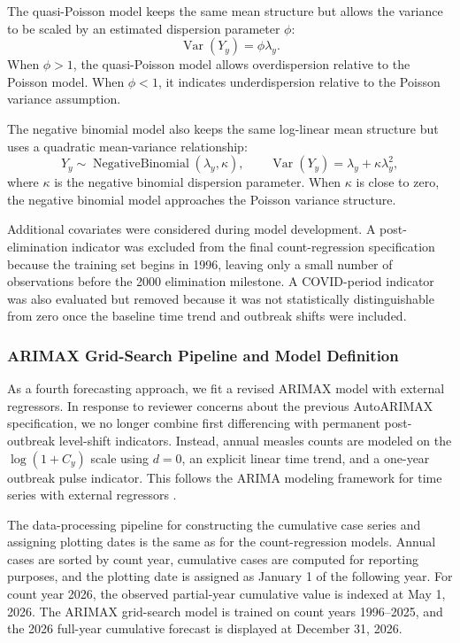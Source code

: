 \documentclass[utf8]{FrontiersinHarvard} %
\begin{document}
The quasi-Poisson model keeps the same mean structure but allows the variance to be scaled by an estimated dispersion parameter \(\phi\):
\[
\operatorname{Var}(Y_y)=\phi\lambda_y.
\]
When \(\phi>1\), the quasi-Poisson model allows overdispersion relative to the Poisson model. When \(\phi<1\), it indicates underdispersion relative to the Poisson variance assumption.

The negative binomial model also keeps the same log-linear mean structure but uses a quadratic mean-variance relationship:
\[Y_y \sim \operatorname{Negative Binomial}(\lambda_y,\kappa),
\qquad
\operatorname{Var}(Y_y)=\lambda_y+\kappa\lambda_y^2,
\]
where \(\kappa\) is the negative binomial dispersion parameter. When \(\kappa\) is close to zero, the negative binomial model approaches the Poisson variance structure.

Additional covariates were considered during model development. A post-elimination indicator was excluded from the final count-regression specification because the training set begins in 1996, leaving only a small number of observations before the 2000 elimination milestone. A COVID-period indicator was also evaluated but removed because it was not statistically distinguishable from zero once the baseline time trend and outbreak shifts were included.

\subsubsection{ARIMAX Grid-Search Pipeline and Model Definition}
As a fourth forecasting approach, we fit a revised ARIMAX model with external regressors. In response to reviewer concerns about the previous AutoARIMAX specification, we no longer combine first differencing with permanent post-outbreak level-shift indicators. Instead, annual measles counts are modeled on the \(\log(1+C_y)\) scale using \(d=0\), an explicit linear time trend, and a one-year outbreak pulse indicator. This follows the ARIMA modeling framework for time series with external regressors \citep{box2015,hyndman2008,hyndman2021,chukwu2025time}.

The data-processing pipeline for constructing the cumulative case series and assigning plotting dates is the same as for the count-regression models. Annual cases are sorted by count year, cumulative cases are computed for reporting purposes, and the plotting date is assigned as January 1 of the following year. For count year 2026, the observed partial-year cumulative value is indexed at May 1, 2026. The ARIMAX grid-search model is trained on count years 1996--2025, and the 2026 full-year cumulative forecast is displayed at December 31, 2026.
\end{document}
